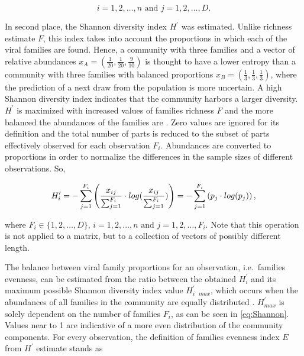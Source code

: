 \documentclass[
  openany]{book}
\begin{document}
\begin{equation*} 
 i = 1,2, \ldots, n \text{ and } j=1,2,\ldots,D\text{.}
\end{equation*}

In second place, the Shannon diversity index \(H^\prime\) was estimated. Unlike richness estimate \(F\), this index takes into account the proportions in which each of the viral families are found. Hence, a community with three families and a vector of relative abundances \(x_A = (\frac{1}{20}, \frac{1}{20}, \frac{9}{10})\) is thought to have a lower entropy than a community with three families with balanced proportions \(x_B = (\frac{1}{3}, \frac{1}{3}, \frac{1}{3})\), where the prediction of a next draw from the population is more uncertain. A high Shannon diversity index indicates that the community harbors a larger diversity. \(H^\prime\) is maximized with increased values of families richness \(F\) and the more balanced the abundances of the families are \autocite{Ludwig1988}. Zero values are ignored for its definition and the total number of parts is reduced to the subset of parts effectively observed for each observation \(F_i\). Abundances are converted to proportions in order to normalize the differences in the sample sizes of different observations. So,

\begin{equation} 
  H^\prime_i =  
  -\sum^{F_i}_{j=1}\left(\frac{x_{ij}}{\sum^{F_i}_{j=1}} \cdot log(\frac{x_{ij}}{\sum^{F_i}_{j=1}}) \right) = 
  -\sum^{F_i}_{j=1}\left(p_j \cdot log(p_j) \right)\text{,}\\
  \label{eq:Shannon}
\end{equation}

where \(F_i \in \{1,2,\ldots,D\} \text{, } i = 1,2,\ldots,n \text{ and } j = 1,2,\ldots,F_i\text{.}\) Note that this operation is not applied to a matrix, but to a collection of vectors of possibly different length.

The balance between viral family proportions for an observation, i.e.~families evenness, can be estimated from the ratio between the obtained \(H^\prime_i\) and its maximum possible Shannon diversity index value \(H^\prime_{i \text{ } max}\), which occurs when the abundances of all families in the community are equally distributed \autocite{Ludwig1988}. \(H^\prime_{max}\) is solely dependent on the number of families \(F_i\), as can be seen in \eqref{eq:Shannon}. Values near to 1 are indicative of a more even distribution of the community components. For every observation, the definition of families evenness index \(E\) from \(H^\prime\) estimate stands as
\end{document}
